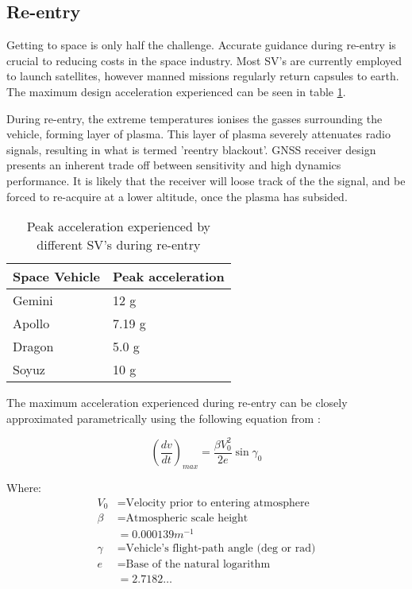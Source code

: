 \subsection{Re-entry}
Getting to space is only half the challenge. Accurate guidance during re-entry is crucial to reducing costs in the space industry. Most \ac{SV}'s are currently employed to launch satellites, however manned missions regularly return capsules to earth. The maximum design acceleration experienced can be seen in table \ref{ReEntryTable}. 

During re-entry, the extreme temperatures ionises the gasses surrounding the vehicle, forming  layer of plasma. This layer of plasma severely attenuates radio signals, resulting in what is termed 'reentry blackout'. GNSS receiver design presents an inherent trade off between sensitivity and high dynamics performance. It is likely that the receiver will loose track of the the signal, and be forced to re-acquire at a lower altitude, once the plasma has subsided. 


\begin{table}[!htb]
\centering
\begin{tabular}{|l|l|}
\hline
\rowcolor[HTML]{C0C0C0} 
Space Vehicle & Peak acceleration                    \\ \hline
Gemini        & 12 g \cite{FAA}                      \\ \hline
\rowcolor[HTML]{EFEFEF} 
Apollo        & 7.19 g \cite{johnston1975biomedical} \\ \hline
Dragon        & 5.0 g \cite{trevino2008spacex}       \\ \hline
\rowcolor[HTML]{EFEFEF} 
Soyuz         & 10 g \cite{ReentryDynamics}          \\ \hline
\end{tabular}
\caption{Peak acceleration experienced by different \ac{SV}'s during re-entry}
\label{ReEntryTable}
\end{table}

The maximum acceleration experienced during re-entry can be closely approximated parametrically using the following equation from \cite{eastre}: 

\begin{equation}
(\frac{dv}{dt})_{max} = \frac{\beta V_0^2}{2e} \sin \gamma_0
\end{equation}

Where:
\begin{align*}
V_0 &= \text{Velocity prior to entering atmosphere}\\
 \beta &= \text{Atmospheric scale height}\\
       &= 0.000139 m^{-1}\\
\gamma &= \text{Vehicle's flight-path angle (deg or rad)}\\
     e &= \text{Base of the natural logarithm}\\
       &= 2.7182\ldots
\end{align*}

